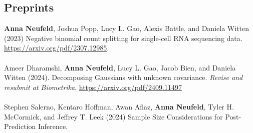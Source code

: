 \documentclass[margin, 10pt]{res}
\begin{document}
\begin{resume}
\section{Preprints} 
\textbf{Anna Neufeld}, Joshua Popp, Lucy L. Gao, Alexis Battle, and Daniela Witten (2023) Negative binomial count splitting for single-cell RNA sequencing data. \\ \href{https://arxiv.org/pdf/2307.12985}{https://arxiv.org/pdf/2307.12985}. \\
\\
Ameer Dharamshi, \textbf{Anna Neufeld}, Lucy L. Gao, Jacob Bien, and Daniela Witten (2024). Decomposing Gaussians with unknown covariance. \emph{Revise and resubmit at Biometrika}. \href{https://arxiv.org/pdf/2409.11497}{https://arxiv.org/pdf/2409.11497} \\
\\
Stephen Salerno, Kentaro Hoffman,  Awan Afiaz, \textbf{Anna Neufeld}, Tyler H. McCormick, and Jeffrey T. Leek (2024) Sample Size Considerations for Post-Prediction Inference. %

\end{resume}
\end{document}

